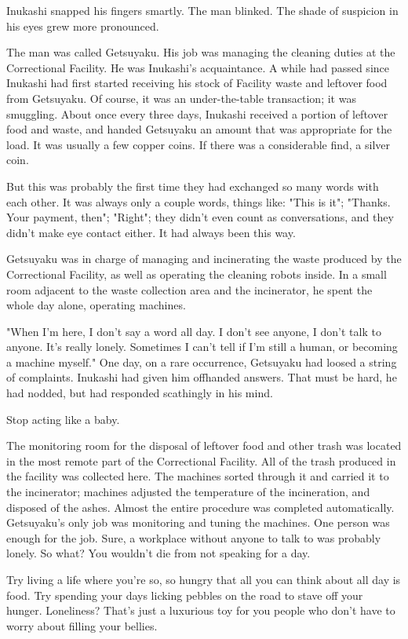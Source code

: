 Inukashi snapped his fingers smartly. The man blinked. The shade of
suspicion in his eyes grew more pronounced.

The man was called Getsuyaku. His job was managing the cleaning duties
at the Correctional Facility. He was Inukashi's acquaintance. A while
had passed since Inukashi had first started receiving his stock of
Facility waste and leftover food from Getsuyaku. Of course, it was an
under-the-table transaction; it was smuggling. About once every three
days, Inukashi received a portion of leftover food and waste, and handed
Getsuyaku an amount that was appropriate for the load. It was usually a
few copper coins. If there was a considerable find, a silver coin.

But this was probably the first time they had exchanged so many words
with each other. It was always only a couple words, things like: "This
is it"; "Thanks. Your payment, then"; "Right"; they didn't even count as
conversations, and they didn't make eye contact either. It had always
been this way.

Getsuyaku was in charge of managing and incinerating the waste produced
by the Correctional Facility, as well as operating the cleaning robots
inside. In a small room adjacent to the waste collection area and the
incinerator, he spent the whole day alone, operating machines.

"When I'm here, I don't say a word all day. I don't see anyone, I don't
talk to anyone. It's really lonely. Sometimes I can't tell if I'm still
a human, or becoming a machine myself." One day, on a rare occurrence,
Getsuyaku had loosed a string of complaints. Inukashi had given him
offhanded answers. That must be hard, he had nodded, but had responded
scathingly in his mind.~

Stop acting like a baby.

The monitoring room for the disposal of leftover food and other trash
was located in the most remote part of the Correctional Facility. All of
the trash produced in the facility was collected here. The machines
sorted through it and carried it to the incinerator; machines adjusted
the temperature of the incineration, and disposed of the ashes. Almost
the entire procedure was completed automatically. Getsuyaku's only job
was monitoring and tuning the machines. One person was enough for the
job. Sure, a workplace without anyone to talk to was probably lonely. So
what? You wouldn't die from not speaking for a day.

Try living a life where you're so, so hungry that all you can think
about all day is food. Try spending your days licking pebbles on the
road to stave off your hunger. Loneliness? That's just a luxurious toy
for you people who don't have to worry about filling your bellies.

